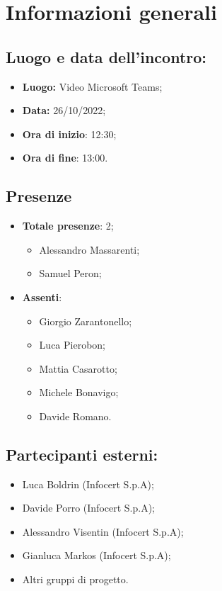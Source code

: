 \section{Informazioni generali}

\subsection{Luogo e data dell'incontro:}
\begin{itemize}
    \item \textbf{Luogo:} Video Microsoft Teams;
    \item \textbf{Data:} 26/10/2022;
    \item \textbf{Ora di inizio}: 12:30;
    \item \textbf{Ora di fine}: 13:00.
\end{itemize}
\subsection{Presenze}
\begin{itemize}
    \item \textbf{Totale presenze}: 2;
    \begin{itemize}
        \item Alessandro Massarenti;
        \item Samuel Peron;
    \end{itemize}
    \item \textbf{Assenti}:
    \begin{itemize}
        \item Giorgio Zarantonello;
        \item Luca Pierobon;
        \item Mattia Casarotto;
        \item Michele Bonavigo;
        \item Davide Romano.
    \end{itemize}
\end{itemize}
\subsection{Partecipanti esterni:}
\begin{itemize}
    \item Luca Boldrin (Infocert S.p.A);
    \item Davide Porro (Infocert S.p.A);
    \item Alessandro Visentin (Infocert S.p.A);
    \item Gianluca Markos (Infocert S.p.A);
    \item Altri gruppi di progetto.
\end{itemize}